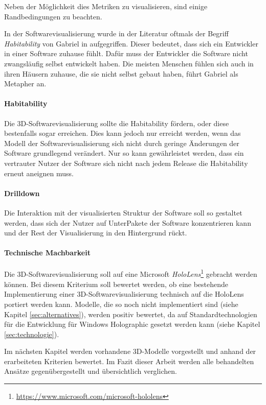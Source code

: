 Neben der Möglichkeit dies Metriken zu visualisieren, sind einige Randbedingungen zu beachten.

In der Softwarevisualisierung wurde in der Literatur oftmals der Begriff \textit{Habitability} von Gabriel in \cite{gabriel1996patterns} aufgegriffen. Dieser bedeutet, dass sich ein Entwickler in einer Software zuhause fühlt. Dafür muss der Entwickler die Software nicht zwangsläufig selbst entwickelt haben. Die meisten Menschen fühlen sich auch in ihren Häusern zuhause, die sie nicht selbst gebaut haben, führt Gabriel als Metapher an.

\paragraph{Habitability} Die 3D-Softwarevisualisierung sollte die Habitability fördern, oder diese bestenfalls sogar erreichen. Dies kann jedoch nur erreicht werden, wenn das Modell der Softwarevisualisierung sich nicht durch geringe Änderungen der Software grundlegend verändert. Nur so kann gewährleistet werden, dass ein vertrauter Nutzer der Software sich nicht nach jedem Release die Habitability erneut aneignen muss.

\paragraph{Drilldown} Die Interaktion mit der visualisierten Struktur der Software soll so gestaltet werden, dass sich der Nutzer auf UnterPakete der Software konzentrieren kann und der Rest der Visualisierung in den Hintergrund rückt.

\paragraph{Technische Machbarkeit} Die 3D-Softwarevisualisierung soll auf eine Microsoft \textit{HoloLens}\footnote{\url{https://www.microsoft.com/microsoft-hololens}} gebracht werden können. Bei diesem Kriterium soll bewertet werden, ob eine bestehende Implementierung einer 3D-Softwarevisualisierung technisch auf die HoloLens portiert werden kann. Modelle, die so noch nicht implementiert sind (siehe Kapitel \ref{sec:alternatives}), werden positiv bewertet, da auf Standardtechnologien für die Entwicklung für Windows Holographic gesetzt werden kann (siehe Kapitel \ref{sec:technologie}).

Im nächsten Kapitel werden vorhandene 3D-Modelle vorgestellt und anhand der erarbeiteten Kriterien bewertet. Im Fazit dieser Arbeit werden alle behandelten Ansätze gegenübergestellt und übersichtlich verglichen.


